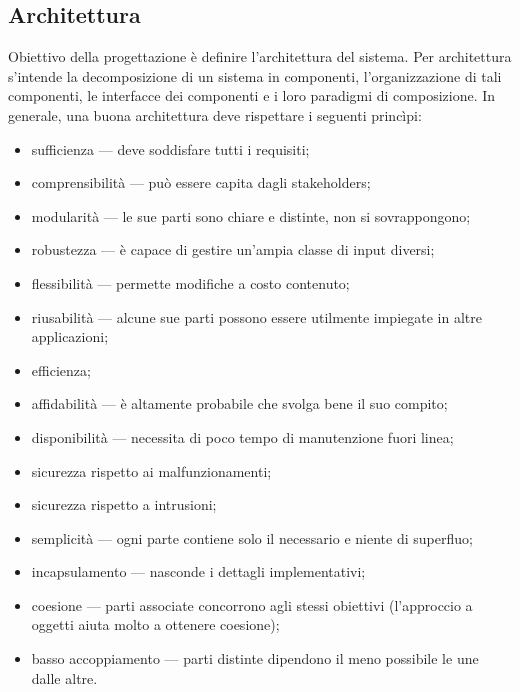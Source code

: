\documentclass[a4paper]{article}
\begin{document}
		
	\subsection{Architettura}

		
Obiettivo della progettazione è definire l'architettura del sistema. Per architettura s'intende la decomposizione di un sistema in componenti, l'organizzazione di tali componenti, le interfacce dei componenti e i loro paradigmi di composizione. In generale, una buona architettura deve rispettare i seguenti princìpi:
		
	\begin{itemize}
		
			
	\item sufficienza --- deve soddisfare tutti i requisiti;
			
	\item comprensibilità --- può essere capita dagli stakeholders;
			
	\item modularità --- le sue parti sono chiare e distinte, non si sovrappongono;
			
	\item robustezza --- è capace di gestire un'ampia classe di input diversi;
			
	\item flessibilità --- permette modifiche a costo contenuto;
			
	\item riusabilità --- alcune sue parti possono essere utilmente impiegate in altre applicazioni;
			
	\item efficienza;
			
	\item affidabilità --- è altamente probabile che svolga bene il suo compito;
			
	\item disponibilità --- necessita di poco tempo di manutenzione fuori linea;
			
	\item sicurezza rispetto ai malfunzionamenti;
			
	\item sicurezza rispetto a intrusioni;
			
	\item semplicità --- ogni parte contiene solo il necessario e niente di superfluo;
			
	\item incapsulamento --- nasconde i dettagli implementativi;
			
	\item coesione --- parti associate concorrono agli stessi obiettivi (l'approccio a oggetti aiuta molto a ottenere coesione);
			
	\item basso accoppiamento --- parti distinte dipendono il meno possibile le une dalle altre.
		
	\end{itemize}
\end{document}
